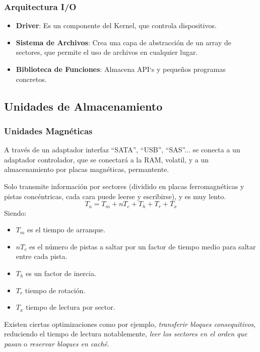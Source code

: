 \subsubsection{Arquitectura I/O}
\begin{itemize}
        \item \textbf{Driver}: Es un componente del Kernel, que controla dispositivos.
        \item \textbf{Sistema de Archivos}: Crea una capa de abstracción de un array de sectores, que permite el uso de archivos en cualquier lugar.
        \item \textbf{Biblioteca de Funciones}: Almacena API`s y pequeños programas concretos.
\end{itemize}
\subsection{Unidades de Almacenamiento}
\subsubsection{Unidades Magnéticas}
\noindent A través de un adaptador interfaz ``SATA'', ``USB'', ``SAS''... se conecta a un adaptador controlador, que se conectará a la RAM, volatil, y a un almacenamiento por placas magnéticas, permantente.
\par \noindent Solo transmite información por sectores (dividido en placas ferromagnéticas y pistas concéntricas, cada cara puede leerse y escribirse), y es muy lento.
\[
        \boxed{T_a = T_m + nT_c + T_h + T_r + T_x}
\]
\noindent Siendo:
\begin{itemize}
        \item \(T_m\) es el tiempo de arranque.
        \item \(nT_c\) es el número de pistas a saltar por un factor de tiempo medio para saltar entre cada pista.
        \item \(T_h\) es un factor de inercia.
        \item \(T_r\) tiempo de rotación.
        \item \(T_x\) tiempo de lectura por sector.
\end{itemize}
\noindent Existen ciertas optimizaciones como por ejemplo, \textit{transferir bloques consequitivos}, reduciendo el tiempo de lectura notablemente, \textit{leer los sectores en el orden que pasan} o \textit{reservar bloques en caché}.
